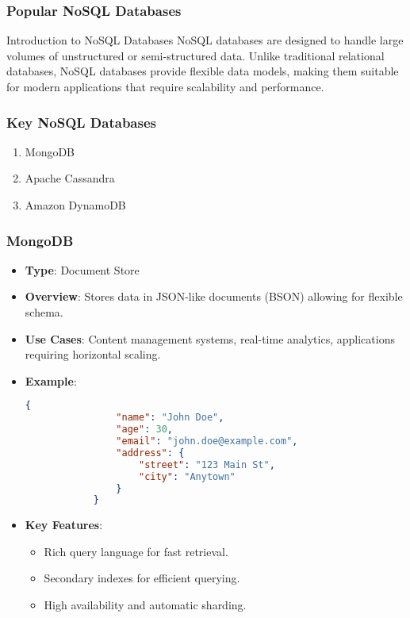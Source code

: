 \documentclass[aspectratio=169]{beamer}
\begin{document}
\begin{frame}
    \frametitle{Popular NoSQL Databases}
    \begin{block}{Introduction to NoSQL Databases}
        NoSQL databases are designed to handle large volumes of unstructured or semi-structured data. Unlike traditional relational databases, NoSQL databases provide flexible data models, making them suitable for modern applications that require scalability and performance.
    \end{block}
\end{frame}

\begin{frame}
    \frametitle{Key NoSQL Databases}
    \begin{enumerate}
        \item MongoDB
        \item Apache Cassandra
        \item Amazon DynamoDB
    \end{enumerate}
\end{frame}

\begin{frame}[fragile]
    \frametitle{MongoDB}
    \begin{itemize}
        \item \textbf{Type}: Document Store
        \item \textbf{Overview}: Stores data in JSON-like documents (BSON) allowing for flexible schema.
        \item \textbf{Use Cases}: Content management systems, real-time analytics, applications requiring horizontal scaling.
        \item \textbf{Example}:
            \begin{lstlisting}[language=json]
            {
                "name": "John Doe",
                "age": 30,
                "email": "john.doe@example.com",
                "address": {
                    "street": "123 Main St",
                    "city": "Anytown"
                }
            }
            \end{lstlisting}
        \item \textbf{Key Features}:
            \begin{itemize}
                \item Rich query language for fast retrieval.
                \item Secondary indexes for efficient querying.
                \item High availability and automatic sharding.
            \end{itemize}
    \end{itemize}
\end{frame}
\end{document}
